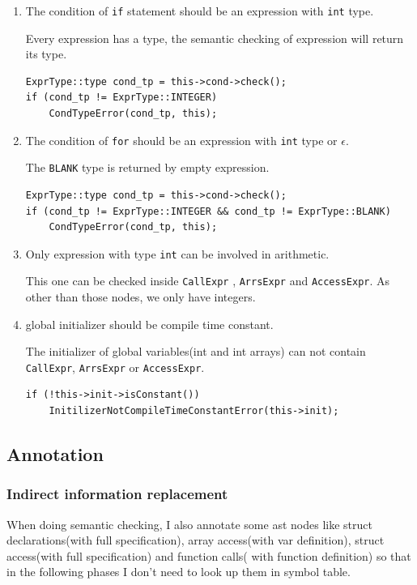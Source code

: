 \documentclass[11pt]{article}
\begin{document}
\begin{enumerate}
\item The condition of \texttt{if} statement should be an expression with \texttt{int} type.

Every expression has a type, the semantic checking of expression will
return its type.
\begin{verbatim}
ExprType::type cond_tp = this->cond->check();
if (cond_tp != ExprType::INTEGER)
    CondTypeError(cond_tp, this);
\end{verbatim}

\item The condition of \texttt{for} should be an expression with \texttt{int} type or
\(\epsilon\).

The \texttt{BLANK} type is returned by empty expression.
\begin{verbatim}
ExprType::type cond_tp = this->cond->check();
if (cond_tp != ExprType::INTEGER && cond_tp != ExprType::BLANK)
    CondTypeError(cond_tp, this);
\end{verbatim}

\item Only expression with type \texttt{int} can be involved in arithmetic.

This one can be checked inside \texttt{CallExpr} , \texttt{ArrsExpr} and \texttt{AccessExpr}.
As other than those nodes, we only have integers.

\item global initializer should be compile time constant.

The initializer of global variables(int and int arrays) can not contain
\texttt{CallExpr}, \texttt{ArrsExpr} or \texttt{AccessExpr}.

\begin{verbatim}
if (!this->init->isConstant())
    InitilizerNotCompileTimeConstantError(this->init);
\end{verbatim}
\end{enumerate}

\subsection{Annotation}
\label{sec:orgheadline17}
\subsubsection{Indirect information replacement}
\label{sec:orgheadline13}
When doing semantic checking, I also annotate some ast nodes like struct
declarations(with full specification), array access(with var definition),
struct access(with full specification)  and function calls( with function definition) so that in the following phases I don't need
to look up them in symbol table.
\end{document}
